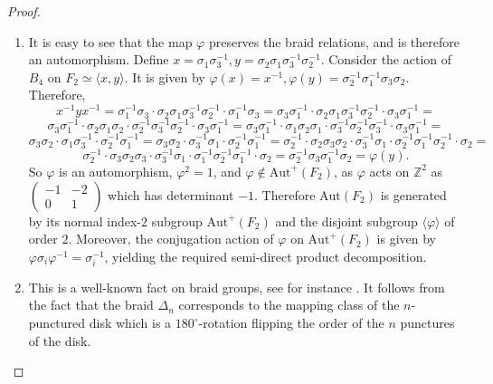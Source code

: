 \documentclass[letterpaper]{amsart}
\begin{document}
\begin{proof}
\begin{enumerate}
    \item It is easy to see that the map $\varphi$ preserves the braid relations, and is therefore an automorphism.
    Define $x = \sigma_1\sigma_3^{-1}, y = \sigma_2\sigma_1\sigma_3^{-1}\sigma_2^{-1}$. Consider the action of $B_4$ on $F_2 \simeq \langle x, y\rangle.$ It is given by $\varphi(x) = x^{-1}, \varphi(y) = \sigma_2^{-1} \sigma_1^{-1} \sigma_3 \sigma_2$. Therefore,
    $$x^{-1} y x^{-1} = \sigma_1^{-1} \sigma_3 \cdot \sigma_2 \sigma_1 \sigma_3^{-1} \sigma_2^{-1} \cdot \sigma_1^{-1} \sigma_3 = \sigma_3 \sigma_1^{-1} \cdot \sigma_2 \sigma_1 \sigma_3^{-1} \sigma_2^{-1 } \cdot \sigma_3 \sigma_1^{-1} =$$
    $$\sigma_3 \sigma_1^{-1} \cdot \sigma_2 \sigma_1 \sigma_2 \cdot \sigma_2^{-1}\sigma_3^{-1} \sigma_2^{-1 } \cdot \sigma_3 \sigma_1^{-1} = \sigma_3 \sigma_1^{-1} \cdot \sigma_1 \sigma_2 \sigma_1 \cdot \sigma_3^{-1}\sigma_2^{-1} \sigma_3^{-1 } \cdot \sigma_3 \sigma_1^{-1} =$$
    $$\sigma_3 \sigma_2 \cdot \sigma_1 \sigma_3^{-1} \cdot \sigma_2^{-1} \sigma_1^{-1} = \sigma_3 \sigma_2 \cdot \sigma_3^{-1} \sigma_1 \cdot \sigma_2^{-1} \sigma_1^{-1} = \sigma_2^{-1} \cdot \sigma_2 \sigma_3 \sigma_2 \cdot \sigma_3^{-1} \sigma_1 \cdot \sigma_2^{-1} \sigma_1^{-1} \sigma_2^{-1} \cdot \sigma_2 = $$
    $$\sigma_2^{-1} \cdot \sigma_3 \sigma_2 \sigma_3 \cdot \sigma_3^{-1} \sigma_1 \cdot \sigma_1^{-1} \sigma_2^{-1} \sigma_1^{-1} \cdot \sigma_2 = \sigma_2^{-1} \sigma_3 \sigma_1^{-1} \sigma_2 = \varphi(y).$$
So $\varphi$ is an automorphism, $\varphi^2 = 1$, and $\varphi \notin \mathrm{Aut}^+(F_2)$, as $\varphi$ acts on $\mathbb{Z}^2$ as $\begin{pmatrix}-1 & -2 \\ 0 & 1\end{pmatrix}$ which has determinant $-1$. Therefore $\mathrm{Aut}(F_2)$ is generated by its normal index-$2$ subgroup $\mathrm{Aut}^+(F_2)$ and the disjoint subgroup $\langle\varphi\rangle$ of order $2$. Moreover, the conjugation action of $\varphi$ on $\mathrm{Aut}^+(F_2)$ is given by $\varphi \sigma_i \varphi^{-1} = \sigma_i^{-1}$, yielding the required semi-direct product decomposition.

\item This is a well-known fact on braid groups, see for instance \cite[Proposition 9.1.16, Equation 9.1.13]{epstein1992word}. It follows from the fact that the braid $\Delta_n$ corresponds to the mapping class of the $n$-punctured disk which is a $180^\circ$-rotation flipping the order of the $n$ punctures of the disk.
\end{enumerate}
\end{proof}
\end{document}
